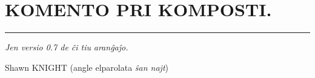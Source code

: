 \documentclass[12pt,twoside]{book}
\newcommand{\laversio}{0.7}
\begin{document}
%
\titleformat{\chapter}[display]{\centering\sansfont}{\chaptertitlename}{0pt}{\large}
\chapter*{KOMENTO PRI KOMPOSTI.}

\begin{center}
\rule[0.5ex]{0.5\textwidth}{0.4pt}

\emph{Jen versio \laversio{} de ĉi tiu} \XeLaTeX{} \emph{aranĝaĵo.}
\end{center}

\vspace{1ex}

{\setlength{\parindent}{0em}
Shawn KNIGHT (angle elparolata \emph{ŝan najt})\\
\hodiau}


\end{document}
